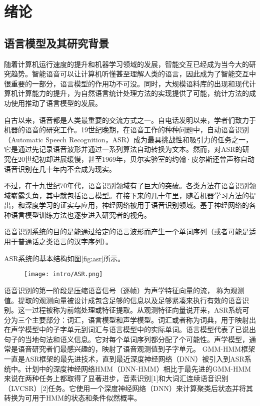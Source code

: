 

\chapter{绪论}
\label{chap:intro}
\section{语言模型及其研究背景}
随着计算机运行速度的提升和机器学习领域的发展，智能交互已经成为当今大的研究趋势。智能语音可以让计算机听懂甚至理解人类的语言，因此成为了智能交互中很重要的一部分，语言模型的作用功不可没。同时，大规模语料库的出现和现代计算机计算能力的提升，为自然语言统计处理方法的实现提供了可能，统计方法的成功使用推动了语言模型的发展。

自古以来，语音都是人类最重要的交流方式之一。自电话发明以来，学者们致力于机器的语音的研究工作。19世纪晚期，在语音工作的种种问题中，自动语音识别（Automatic Speech Recognition，ASR）成为最具挑战性和吸引力的任务之一，它是通过先记录语音波形并通过一系列算法自动转换为文本。然而，对ASR的研究在20世纪初却进展缓慢，甚至1969年，贝尔实验室的约翰·皮尔斯还曾声称自动语音识别在几十年内不会成为现实。

不过，在十九世纪70年代，语音识别领域有了巨大的突破。各类方法在语音识别领域崭露头角，其中就包括语言模型。在接下来的几十年里，随着机器学习方法的提出，和深度学习的证实与应用，神经网络被用于语音识别领域。基于神经网络的各种语言模型训练方法也逐步进入研究者的视角。

语音识别系统的目的是能通过给定的语言波形而产生一个单词序列（或者可能是适用于普通话之类语言的汉字序列）。

ASR系统的基本结构如图\ref{fig:asr}所示\cite{}。


\begin{figure}[!htbp]
  \centering
  \begin{minipage}[b]{0.6\textwidth}
    \captionstyle{\centering}
    \centering
    \texttt{[image: intro/ASR.png]}
  \end{minipage}     
\end{figure}

语音识别的第一阶段是压缩语音信号（逐帧）为声学特征向量的流， 称为观测值。提取的观测向量被设计成包含足够的信息以及足够紧凑来执行有效的语音识别。这一过程被称为前端处理或特征提取。从观测特征向量说开来，ASR系统可分为三个主要部分：词汇，语言模型和声学模型。词汇或者称为词典，用于映射出在声学模型中的子字单元到词汇与语言模型中的实际单词。语言模型代表了已说出句子的当地句法和语义信息。它对每个单词序列都分配了个可能性。声学模型，通常是语音研究者们最感兴趣的，映射了语音观测值到子字单元。 GMM-HMM框架一直是ASR框架的最先进技术，直到最近深度神经网络（DNN）被引入到ASR系统中。计划中的深度神经网络HMM（DNN-HMM）相比于最先进的GMM-HMM来说在两种任务上都取得了显著进步，音素识别[1]和大词汇连续语音识别（LVCSR）[2]任务。它使用一个深度神经网络（DNN）来计算聚类后状态并将其转换为可用于HMM的状态和条件似然概率。

